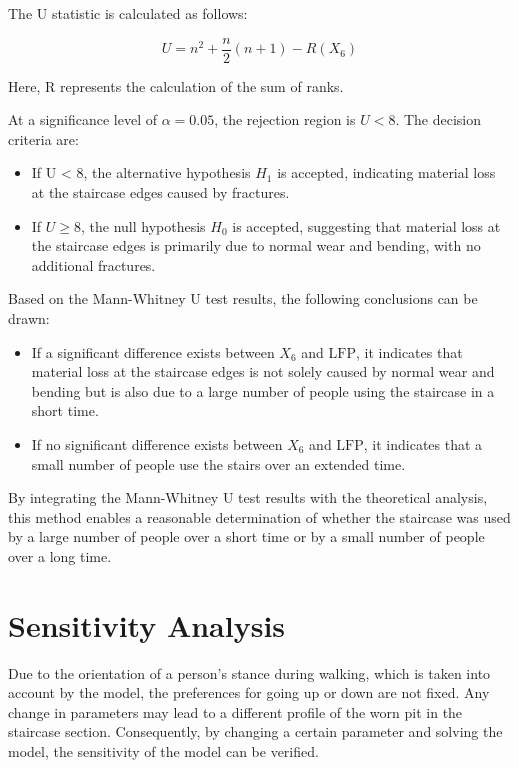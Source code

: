 \documentclass{mcmthesis}
\begin{document}
The U statistic is calculated as follows:

$$U = n^2 + \frac{n}{2}(n + 1) - R(X_6)$$

Here, R represents the calculation of the sum of ranks.

At a significance level of \(\alpha = 0.05\), the rejection region is \(U < 8\). The decision criteria are:
\begin{itemize} 

\item If U < 8, the alternative hypothesis $H_1$ is accepted, indicating material loss at the staircase edges caused by fractures.

\item If \(U \geq 8\), the null hypothesis $H_0$ is accepted, suggesting that material loss at the staircase edges is primarily due to normal wear and bending, with no additional fractures.

\end{itemize}

Based on the Mann-Whitney U test results, the following conclusions can be drawn:


\begin{itemize} 
\item If a significant difference exists between \( X_6 \) and \( \text{LFP} \), it indicates that material loss at the staircase edges is not solely caused by normal wear and bending but is also due to a large number of people using the staircase in a short time. 
\item If no significant difference exists between \( X_6 \) and \( \text{LFP} \), it indicates that a small number of people use the stairs over an extended time. 
\end{itemize}

By integrating the Mann-Whitney U test results with the theoretical analysis, this method enables a reasonable determination of whether the staircase was used by a large number of people over a short time or by a small number of people over a long time.


\section{Sensitivity Analysis}

Due to the orientation of a person's stance during walking, which is taken into account by the model, the preferences for going up or down are not fixed. Any change in parameters may lead to a different profile of the worn pit in the staircase section. Consequently, by changing a certain parameter and solving the model, the sensitivity of the model can be verified.
\end{document}
